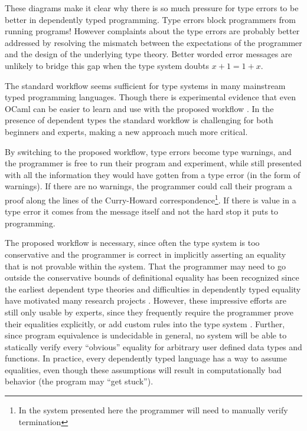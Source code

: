 These diagrams make it clear why there is so much pressure for type errors to be better in dependently typed programming\cite{eremondi2019framework}.
Type errors block programmers from running programs! However complaints about the type errors are probably better addressed by resolving the mismatch between the expectations of the programmer and the design of the underlying type theory.
Better worded error messages are unlikely to bridge this gap when the type system doubts $x+1=1+x$.

The standard workflow seems sufficient for type systems in many mainstream typed programming languages.
Though there is experimental evidence that even OCaml can be easier to learn and use with the proposed workflow \cite{10.1145/2951913.2951915}.
In the presence of dependent types the standard workflow is challenging for both beginners and experts, making a new approach much more critical.


By switching to the proposed workflow, type errors become type warnings, and the programmer is free to run their program and experiment, while still presented with all the information they would have gotten from a type error (in the form of warnings).
If there are no warnings, the programmer could call their program a proof along the lines of the Curry-Howard correspondence\footnote{
  In the system presented here the programmer will need to manually verify termination
}.
If there is value in a type error it comes from the message itself and not the hard stop it puts to programming.

The proposed workflow is necessary, since often the type system is too conservative and the programmer is correct in implicitly asserting an equality that is not provable within the system.
That the programmer may need to go outside the conservative bounds of definitional equality has been recognized since the earliest dependent type theories \cite{Martin-Lof-1972} and difficulties in dependently typed equality have motivated many research projects \cite{HoTTbook,sjoberg2015programming,cockx2021taming}.
However, these impressive efforts are still only usable by experts, since they frequently require the programmer prove their equalities explicitly\cite{HoTTbook,sjoberg2015programming}, or add custom rules into the type system \cite{cockx2021taming}.
Further, since program equivalence is undecidable in general, no system will be able to statically verify every ``obvious'' equality for arbitrary user defined data types and functions.
In practice, every dependently typed language has a way to assume equalities, even though these assumptions will result in computationally bad behavior (the program may ``get stuck'').

